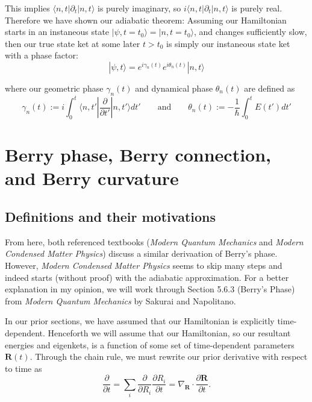 \documentclass[12pt]{revtex4-2}
\begin{document}
This implies $\langle n,t | \partial_t | n,t\rangle$ is purely imaginary, so $i\langle n,t | \partial_t | n,t\rangle$ is purely real.  Therefore we have shown our adiabatic theorem: Assuming our Hamiltonian starts in an instaneous state $|\psi,t=t_0\rangle = |n,t=t_0\rangle$, and changes sufficiently slow, then our true state ket at some later $t > t_0$ is simply our instaneous state ket with a phase factor:
\begin{equation}
    \boxed{ |\psi,t\rangle = e^{i\gamma_n(t)}e^{i\theta_n(t)}|n,t\rangle }
\end{equation}

where our geometric phase $\gamma_n(t)$ and dynamical phase $\theta_n(t)$ are defined as 
\begin{equation}
    \boxed{ \gamma_n(t) := i \int_0^t \langle n,t'| \frac{\partial}{\partial t'} | n,t'\rangle dt' \qquad \text{and} \qquad \theta_n(t) := -\frac{1}{\hbar}\int_0^t E(t')dt' }
\end{equation}

\section{Berry phase, Berry connection, and Berry curvature}
\subsection{Definitions and their motivations}

From here, both referenced textbooks (\emph{Modern Quantum Mechanics} and \emph{Modern Condensed Matter Physics}) discuss a similar derivaation of Berry's phase.  However, \emph{Modern Condensed Matter Physics} seems to skip many steps and indeed starts (without proof) with the adiabatic approximation.  For a better explanation in my opinion, we will work through Section 5.6.3 (Berry's Phase) from \emph{Modern Quantum Mechanics} by Sakurai and Napolitano. \par

In our prior sections, we have assumed that our Hamiltonian is explicitly time-dependent.  Henceforth we will assume that our Hamiltonian, so our resultant energies and eigenkets, is a function of some set of time-dependent parameters $\mathbf{R}(t)$.  Through the chain rule, we must rewrite our prior derivative with respect to time as 
\begin{equation}
    \frac{\partial}{\partial t} = \sum_i \frac{\partial}{\partial R_i}\frac{\partial R_i}{\partial t} = \nabla_{\mathbf{R}} \cdot \frac{\partial \mathbf{R}}{\partial t}.
\end{equation}
\end{document}
